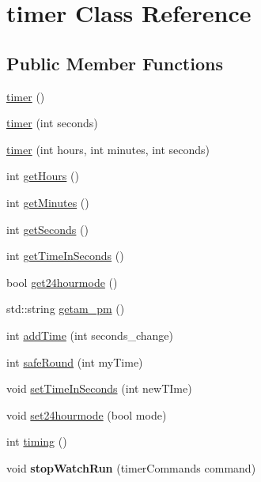 \hypertarget{classtimer}{}\section{timer Class Reference}
\label{classtimer}
\subsection*{Public Member Functions}
\begin{DoxyCompactItemize}
\item 
\hyperlink{classtimer_ae536faf93e02933cd025a6fbcbb48d0a}{timer} ()
\item 
\hyperlink{classtimer_a47a4fa62de8cc93ec9359483cedea776}{timer} (int seconds)
\item 
\hyperlink{classtimer_adeac171bfdf7e5f6a51210227ec8902c}{timer} (int hours, int minutes, int seconds)
\item 
int \hyperlink{classtimer_affe742ff47c230ee4dfaf6ff0d0b85fa}{get\+Hours} ()
\item 
int \hyperlink{classtimer_a94fd8198feb7a53fc06afd0fee97afb7}{get\+Minutes} ()
\item 
int \hyperlink{classtimer_a4615972d080443b34bac1ce74341b645}{get\+Seconds} ()
\item 
int \hyperlink{classtimer_a5925eaa5fed0ad7a94f600d5c45bb464}{get\+Time\+In\+Seconds} ()
\item 
bool \hyperlink{classtimer_a5e81358565d2d761e4e056cf4b95cefe}{get24hourmode} ()
\item 
std\+::string \hyperlink{classtimer_adcb8d6ddbd990b9ee87c3239d33f1e90}{getam\+\_\+pm} ()
\item 
int \hyperlink{classtimer_a075f24defb936b0c2ebf22842487a78c}{add\+Time} (int seconds\+\_\+change)
\item 
int \hyperlink{classtimer_ae10c8e7bdf715550148e90aacfd763d7}{safe\+Round} (int my\+Time)
\item 
void \hyperlink{classtimer_aa0b7033ee73bb2330431d6066cba13ad}{set\+Time\+In\+Seconds} (int new\+T\+Ime)
\item 
void \hyperlink{classtimer_a007ff8ebe4ac52fd96e5e35515ac8a4c}{set24hourmode} (bool mode)
\item 
int \hyperlink{classtimer_aace88860850f3c5ed6fc377826c095d8}{timing} ()
\item 
\hypertarget{classtimer_a8ab8b41b83342d11ca7f751fcf309277}{}void {\bfseries stop\+Watch\+Run} (timer\+Commands command)\label{classtimer_a8ab8b41b83342d11ca7f751fcf309277}


\end{DoxyCompactItemize}
